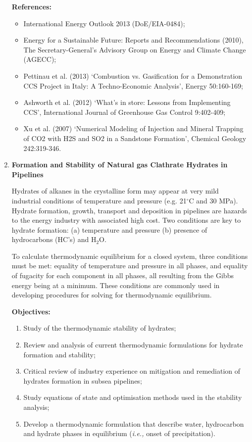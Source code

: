 \documentclass[12pts,a4paper,amsmath,amssymb,floatfix]{article}%
\newcommand{\ie}{{\it i.e., }}
\begin{document}
\begin{enumerate}[label=\bfseries Project: \arabic*:]
\noindent
{\bf References:}
\begin{itemize}
\item International Energy Outlook 2013 (DoE/EIA-0484);
\item Energy for a Sustainable Future: Reports and Recommendations (2010), The Secretary-General’s Advisory Group on Energy and Climate Change (AGECC);
\item Pettinau et al. (2013) `Combustion vs. Gasification for a Demonstration CCS Project in Italy: A Techno-Economic Analysis’, Energy 50:160-169;
\item Ashworth et al. (2012) `What’s in store: Lessons from Implementing CCS’, International Journal of Greenhouse Gas Control 9:402-409;
\item Xu et al. (2007) `Numerical Modeling of Injection and Mineral Trapping of CO2 with H2S and SO2 in a Sandstone Formation’, Chemical Geology 242:319-346.
\end{itemize}

\clearpage

\item {\bf Formation and Stability of Natural gas Clathrate Hydrates in Pipelines}

Hydrates of alkanes in the crystalline form may appear at very mild industrial conditions of temperature and pressure (e.g. 21$^{\circ}$C and 30 MPa).  Hydrate formation, growth, transport and deposition in pipelines are hazards to the energy industry with associated high cost. Two conditions are key to hydrate formation: (a) temperature and pressure (b) presence of hydrocarbons (HC's) and H$_{2}$O.

To calculate thermodynamic equilibrium for a closed system, three conditions must be met: equality of temperature and pressure in all phases, and equality of fugacity for each component in all phases, all resulting from the Gibbs energy being at a minimum. These conditions are commonly used in developing procedures for solving for thermodynamic equilibrium. 

\noindent
{\bf Objectives:}
\begin{enumerate}
\item Study of the thermodynamic stability of hydrates; 
\item Review and analysis of current thermodynamic formulations for hydrate formation and stability;
\item Critical review of industry experience on mitigation and remediation of hydrates formation in subsea pipelines; 
\item Study equations of state and optimisation methods used in the stability analysis;
\item Develop a thermodynamic formulation that describe water, hydrocarbon and hydrate phases in equilibrium (\ie onset of precipitation).
\end{enumerate} 
 


\end{enumerate}
\end{document}
